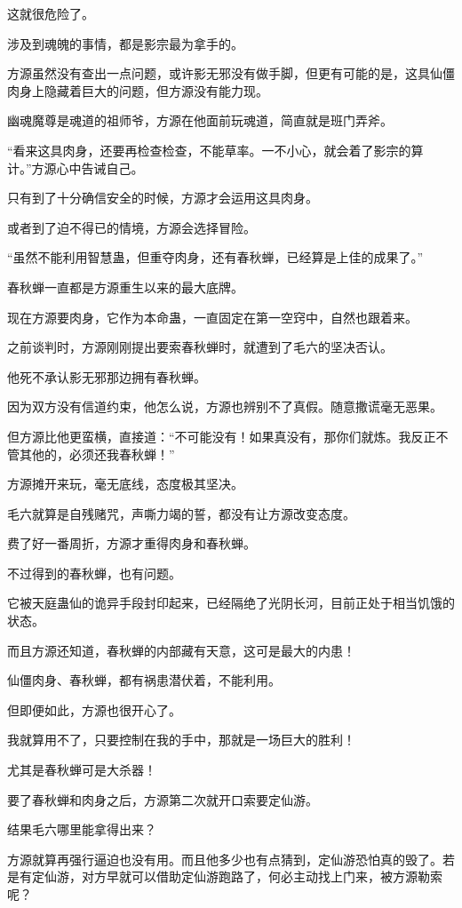 \begin{this_body}
这就很危险了。

涉及到魂魄的事情，都是影宗最为拿手的。

方源虽然没有查出一点问题，或许影无邪没有做手脚，但更有可能的是，这具仙僵肉身上隐藏着巨大的问题，但方源没有能力现。

幽魂魔尊是魂道的祖师爷，方源在他面前玩魂道，简直就是班门弄斧。

“看来这具肉身，还要再检查检查，不能草率。一不小心，就会着了影宗的算计。”方源心中告诫自己。

只有到了十分确信安全的时候，方源才会运用这具肉身。

或者到了迫不得已的情境，方源会选择冒险。

“虽然不能利用智慧蛊，但重夺肉身，还有春秋蝉，已经算是上佳的成果了。”

春秋蝉一直都是方源重生以来的最大底牌。

现在方源要肉身，它作为本命蛊，一直固定在第一空窍中，自然也跟着来。

之前谈判时，方源刚刚提出要索春秋蝉时，就遭到了毛六的坚决否认。

他死不承认影无邪那边拥有春秋蝉。

因为双方没有信道约束，他怎么说，方源也辨别不了真假。随意撒谎毫无恶果。

但方源比他更蛮横，直接道：“不可能没有！如果真没有，那你们就炼。我反正不管其他的，必须还我春秋蝉！”

方源摊开来玩，毫无底线，态度极其坚决。

毛六就算是自残赌咒，声嘶力竭的誓，都没有让方源改变态度。

费了好一番周折，方源才重得肉身和春秋蝉。

不过得到的春秋蝉，也有问题。

它被天庭蛊仙的诡异手段封印起来，已经隔绝了光阴长河，目前正处于相当饥饿的状态。

而且方源还知道，春秋蝉的内部藏有天意，这可是最大的内患！

仙僵肉身、春秋蝉，都有祸患潜伏着，不能利用。

但即便如此，方源也很开心了。

我就算用不了，只要控制在我的手中，那就是一场巨大的胜利！

尤其是春秋蝉可是大杀器！

要了春秋蝉和肉身之后，方源第二次就开口索要定仙游。

结果毛六哪里能拿得出来？

方源就算再强行逼迫也没有用。而且他多少也有点猜到，定仙游恐怕真的毁了。若是有定仙游，对方早就可以借助定仙游跑路了，何必主动找上门来，被方源勒索呢？


\end{this_body}
